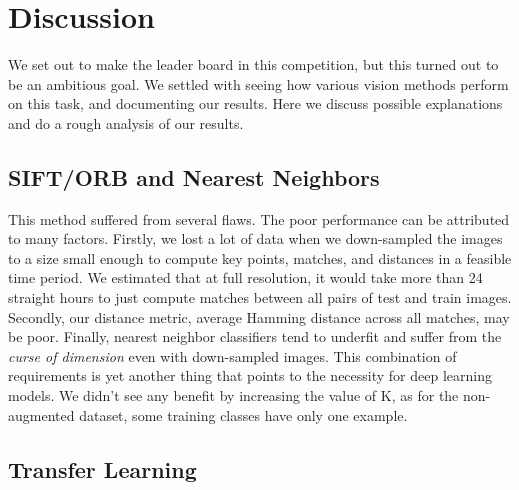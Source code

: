 \section{Discussion}

We set out to make the leader board in this competition, but this turned out to be an ambitious goal. We settled with seeing how various vision methods perform on this task, and documenting our results. Here we discuss possible explanations and do a rough analysis of our results. 

\subsection{SIFT/ORB and Nearest Neighbors}

This method suffered from several flaws. The poor performance can be attributed to many factors. Firstly, we lost a lot of data when we down-sampled the images to a size small enough to compute key points, matches, and distances in a feasible time period. We estimated that at full resolution, it would take more than 24 straight hours to just compute matches between all pairs of test and train images. Secondly, our distance metric, average Hamming distance across all matches, may be poor. Finally, nearest neighbor classifiers tend to underfit and suffer from the \textit{curse of dimension} even with down-sampled images. This combination of requirements is yet another thing that points to the necessity for deep learning models.
We didn't see any benefit by increasing the value of K, as for the non-augmented dataset, some training classes have only one example.

\subsection{Transfer Learning}

